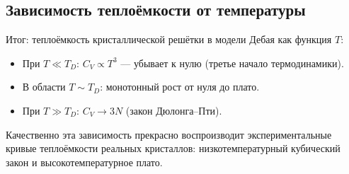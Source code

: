 \documentclass[../general/general]{subfiles}
\begin{document}
\subsection{Зависимость теплоёмкости от температуры}

Итог: теплоёмкость кристаллической решётки в модели Дебая как функция $T$:

\begin{itemize}
    \item При $T \ll T_D$: $C_V \propto T^3$ --- убывает к нулю (третье начало термодинамики).
    \item В области $T \sim T_D$: монотонный рост от нуля до плато.
    \item При $T \gg T_D$: $C_V \to 3N$ (закон Дюлонга--Пти).
\end{itemize}

Качественно эта зависимость прекрасно воспроизводит экспериментальные кривые теплоёмкости реальных кристаллов: низкотемпературный кубический закон и высокотемпературное плато.

\end{document}
